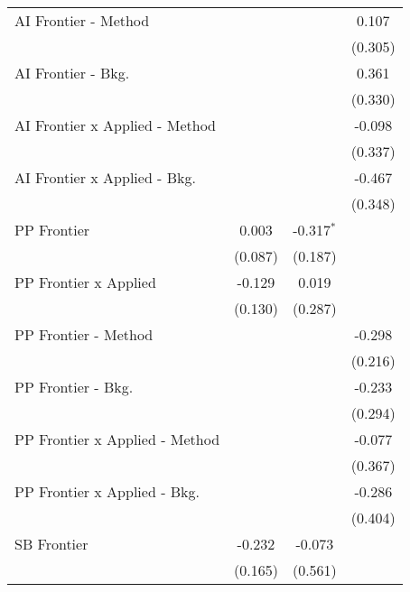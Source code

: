 \begin{tabular}{lccc}
   AI Frontier - Method           &              &               & 0.107\\   
                                  &              &               & (0.305)\\   
   AI Frontier - Bkg.             &              &               & 0.361\\   
                                  &              &               & (0.330)\\   
   AI Frontier x Applied - Method &              &               & -0.098\\   
                                  &              &               & (0.337)\\   
   AI Frontier x Applied - Bkg.   &              &               & -0.467\\   
                                  &              &               & (0.348)\\   
   PP Frontier                    & 0.003        & -0.317$^{*}$  &   \\   
                                  & (0.087)      & (0.187)       &   \\   
   PP Frontier x Applied          & -0.129       & 0.019         &   \\   
                                  & (0.130)      & (0.287)       &   \\   
   PP Frontier - Method           &              &               & -0.298\\   
                                  &              &               & (0.216)\\   
   PP Frontier - Bkg.             &              &               & -0.233\\   
                                  &              &               & (0.294)\\   
   PP Frontier x Applied - Method &              &               & -0.077\\   
                                  &              &               & (0.367)\\   
   PP Frontier x Applied - Bkg.   &              &               & -0.286\\   
                                  &              &               & (0.404)\\   
   SB Frontier                    & -0.232       & -0.073        &   \\   
                                  & (0.165)      & (0.561)       &   \\   

\end{tabular}
